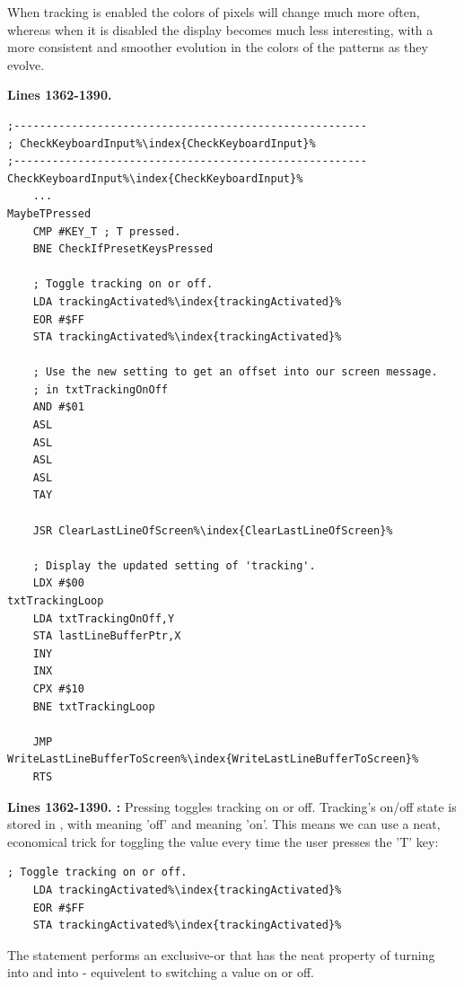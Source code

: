 When tracking is enabled the colors of pixels will change much more often, whereas when it is disabled
the display becomes much less interesting, with a more consistent and smoother evolution in the colors
of the patterns as they evolve.

\clearpage
\textbf{Lines 1362-1390. } 
\begin{lstlisting}[escapechar=\%]
;-------------------------------------------------------
; CheckKeyboardInput%\index{CheckKeyboardInput}%
;-------------------------------------------------------
CheckKeyboardInput%\index{CheckKeyboardInput}%   
    ...
MaybeTPressed   
    CMP #KEY_T ; T pressed.
    BNE CheckIfPresetKeysPressed

    ; Toggle tracking on or off.
    LDA trackingActivated%\index{trackingActivated}%
    EOR #$FF
    STA trackingActivated%\index{trackingActivated}%

    ; Use the new setting to get an offset into our screen message.
    ; in txtTrackingOnOff
    AND #$01
    ASL 
    ASL 
    ASL 
    ASL 
    TAY 

    JSR ClearLastLineOfScreen%\index{ClearLastLineOfScreen}%

    ; Display the updated setting of 'tracking'.
    LDX #$00
txtTrackingLoop   
    LDA txtTrackingOnOff,Y
    STA lastLineBufferPtr,X
    INY 
    INX 
    CPX #$10
    BNE txtTrackingLoop

    JMP WriteLastLineBufferToScreen%\index{WriteLastLineBufferToScreen}%
    RTS 
\end{lstlisting}
\clearpage
{}
\textbf{Lines 1362-1390. :} 
Pressing  toggles tracking on or off. Tracking's on/off state is 
stored in , with  meaning 'off' and
 meaning 'on'. This means we can use a neat, economical trick
for toggling the value every time the user presses the 'T' key:

\begin{lstlisting}[escapechar=\%]
    ; Toggle tracking on or off.
    LDA trackingActivated%\index{trackingActivated}%
    EOR #$FF
    STA trackingActivated%\index{trackingActivated}%
\end{lstlisting}

The  statement performs an exclusive-or that has the neat property of
turning  into  and  into  - equivelent
to switching a value on or off.

